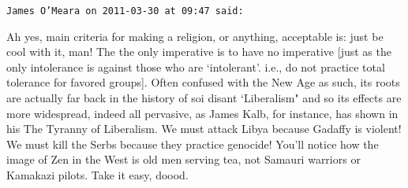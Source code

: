 \begin{footnotesize}\begin{sffamily}



\texttt{James O'Meara on 2011-03-30 at 09:47 said: }

Ah yes, main criteria for making a religion, or anything, acceptable is: just be cool with it, man! The the only imperative is to have no imperative [just as the only intolerance is against those who are `intolerant'. i.e., do not practice total tolerance for favored groups]. Often confused with the New Age as such, its roots are actually far back in the history of soi disant `Liberalism" and so its effects are more widespread, indeed all pervasive, as James Kalb, for instance, has shown in his The Tyranny of Liberalism. We must attack Libya because Gadaffy is violent! We must kill the Serbs because they practice genocide! You'll notice how the image of Zen in the West is old men serving tea, not Samauri warriors or Kamakazi pilots. Take it easy, doood.


\end{sffamily}\end{footnotesize}
